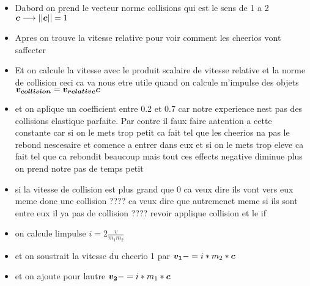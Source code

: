     \begin{itemize}
        \item Dabord on prend le vecteur norme collisions qui est le sens de 1 a 2 $\vb*{c} \longrightarrow ||\vb*{c}|| = 1$ 
        \item Apres on trouve la vitesse relative pour voir comment les cheerios vont saffecter
        \item Et on calcule la vitesse avec le produit scalaire de vitesse relative et la norme de collision ceci ca va nous etre utile quand on calcule m'impulse des objets $\vb*{v_{collision}}=\vb*{v_{relative}}\vb*{c} $
        \item et on aplique un coefficient entre 0.2 et 0.7 car notre experience nest pas des collisions elastique parfaite. Par contre il faux faire aatention a cette constante car si on le mets trop petit ca fait tel que les cheerios na pas le rebond nescesaire et comence a entrer dans eux et si on le mets trop eleve ca fait tel que ca rebondit beaucoup mais tout ces effects negative diminue plus on prend notre pas de temps petit
        \item si la vitesse de collision est plus grand que 0 ca veux dire ils vont vers eux meme donc une collision ???? ca veux dire que autremenet meme si ils sont entre eux il ya pas de collision ???? revoir applique collision et le if
        \item on calcule limpulse $i = 2\frac{v}{m_1 m_2}$
        \item et on soustrait la vitesse du cheerio 1 par $\vb*{v_1} -= i*m_2*\vb*{c}$
        \item et on ajoute pour lautre $\vb*{v_2} -= i*m_1*\vb*{c}$
    \end{itemize} 